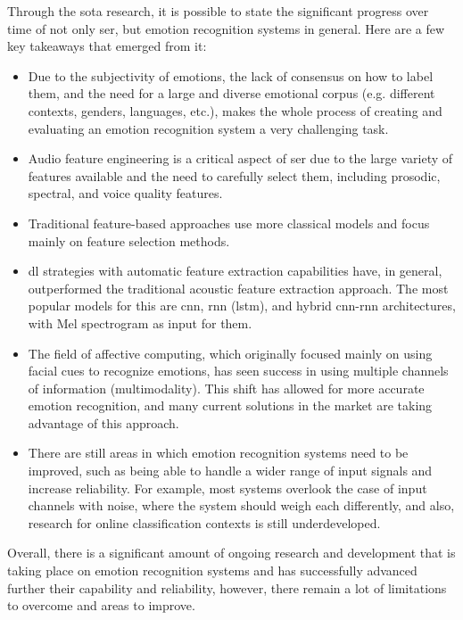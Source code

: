 Through the \ac{sota} research, it is possible to state the significant progress over time of not only \ac{ser}, but emotion recognition systems in general. Here are a few key takeaways that emerged from it:

\begin{itemize}
    \item Due to the subjectivity of emotions, the lack of consensus on how to label them, and the need for a large and diverse emotional corpus (e.g. different contexts, genders, languages, etc.), makes the whole process of creating and evaluating an emotion recognition system a very challenging task.

    \item Audio feature engineering is a critical aspect of \ac{ser} due to the large variety of features available and the need to carefully select them, including prosodic, spectral, and voice quality features.

    \item Traditional feature-based approaches use more classical models and focus mainly on feature selection methods.

    \item \ac{dl} strategies with automatic feature extraction capabilities have, in general, outperformed the traditional acoustic feature extraction approach. The most popular models for this are \ac{cnn}, \ac{rnn} (\ac{lstm}), and hybrid \ac{cnn}-\ac{rnn} architectures, with Mel spectrogram as input for them.

    \item The field of affective computing, which originally focused mainly on using facial cues to recognize emotions, has seen success in using multiple channels of information (multimodality). This shift has allowed for more accurate emotion recognition, and many current solutions in the market are taking advantage of this approach.

    \item There are still areas in which emotion recognition systems need to be improved, such as being able to handle a wider range of input signals and increase reliability. For example, most systems overlook the case of input channels with noise, where the system should weigh each differently, and also, research for online classification contexts is still underdeveloped.

\end{itemize}

Overall, there is a significant amount of ongoing research and development that is taking place on emotion recognition systems and has successfully advanced further their capability and reliability, however, there remain a lot of limitations to overcome and areas to improve.
